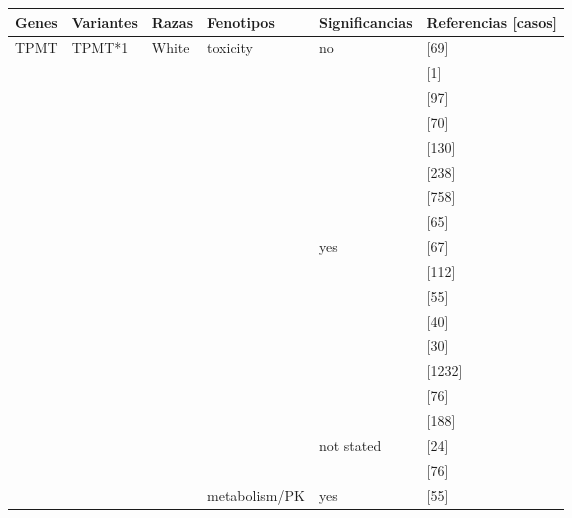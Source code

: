 \begin{center}
\begin{longtable}[H]{|l|l|l|l||l||l|}
\hline
\textbf{Genes}
& \textbf{Variantes}
& \textbf{Razas}
& \textbf{Fenotipos}
& \textbf{Significancias}
& \textbf{Referencias [casos]} \\
\hline
\endhead
\hline\hline
\cline{2-6}
TPMT & TPMT*1 & White & toxicity & no & \citeauthor{pmid12172211} \citeyear{pmid12172211} [69] \\
\cline{6-6}
& & & & & \citeauthor{Yenson_2007} \citeyear{Yenson_2007} [1] \\
\cline{6-6}
& & & & & \citeauthor{Gazouli_2010} \citeyear{Gazouli_2010} [97] \\
\cline{6-6}
& & & & & \citeauthor{Stocco_2005} \citeyear{Stocco_2005} [70] \\
\cline{6-6}
& & & & & \citeauthor{WINTER_2007} \citeyear{WINTER_2007} [130] \\
\cline{6-6}
& & & & & \citeauthor{Moloney_2006} \citeyear{Moloney_2006} [238] \\
\cline{6-6}
& & & & & \citeauthor{pmid20593505} \citeyear{pmid20593505} [758] \\
\cline{6-6}
& & & & & \citeauthor{Breen_2005} \citeyear{Breen_2005} [65] \\
\cline{5-6}
& & & & yes & \citeauthor{pmid9841604} \citeyear{pmid9841604} [67] \\
\cline{6-6}
& & & & & \citeauthor{pmid16044099} \citeyear{pmid16044099} [112] \\
\cline{6-6}
& & & & & \citeauthor{Hindorf_2004} \citeyear{Hindorf_2004} [55] \\
\cline{6-6}
& & & & & \citeauthor{pmid12509611} \citeyear{pmid12509611} [40] \\
\cline{6-6}
& & & & & \citeauthor{pmid10798786} \citeyear{pmid10798786} [30] \\
\cline{6-6}
& & & & & \citeauthor{pmid20593505} \citeyear{pmid20593505} [1232] \\
\cline{6-6}
& & & & & \citeauthor{Colleoni_2013} \citeyear{Colleoni_2013} [76] \\
\cline{6-6}
& & & & & \citeauthor{Wroblova_2012} \citeyear{Wroblova_2012} [188] \\
\cline{5-6}
& & & & not stated & \citeauthor{pmid10376773} \citeyear{pmid10376773} [24] \\
\cline{6-6}
& & & & & \citeauthor{Colleoni_2013} \citeyear{Colleoni_2013} [76] \\
\cline{4-6}
& & & metabolism/PK & yes & \citeauthor{Hindorf_2004} \citeyear{Hindorf_2004} [55] \\

\end{longtable}
\end{center}
